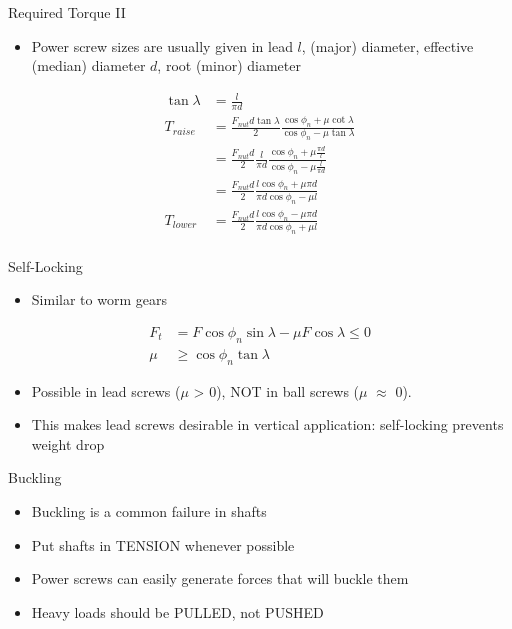 \documentclass[10pt, svgnames]{beamer}
\begin{document}
\begin{frame}[label={sec:orga477ea1}]{Required Torque II}
\begin{itemize}
\item Power screw sizes are usually given in lead \(l\), (major) diameter, effective (median) diameter \(d\), root (minor) diameter
\end{itemize}

\begin{align*}
  \tan \lambda &= \frac{l}{\pi d} \\
  T_{raise} &= \frac{F_{nut}d \tan \lambda}{2} \frac{\cos \phi_{n} + \mu \cot \lambda}{\cos \phi_{n} - \mu \tan \lambda} \\
           &= \frac{F_{nut}d}{2} \frac{l}{\pi d} \frac{\cos \phi_{n} + \mu \frac{\pi d}{l}}{\cos \phi_{n} - \mu \frac{l}{\pi d}} \\
           &= \frac{F_{nut}d}{2} \frac{l \cos \phi_{n} + \mu \pi d}{\pi d \cos \phi_{n} - \mu l} \\
  T_{lower} &= \frac{F_{nut}d}{2} \frac{l \cos \phi_{n} - \mu \pi d}{\pi d \cos \phi_{n} + \mu l} \\
\end{align*}
\end{frame}

\begin{frame}[label={sec:org8ee0539}]{Self-Locking}
\begin{itemize}
\item Similar to worm gears
\end{itemize}

\begin{align*}
  F_{t} &= F \cos \phi_{n} \sin \lambda - \mu F \cos \lambda \leqslant 0 \\
  \mu &\geqslant \cos \phi_{n} \tan \lambda
\end{align*}

\begin{itemize}
\item Possible in lead screws (\(\mu\) > 0), \alert{NOT} in ball screws (\(\mu\) \(\approx\) 0).
\item This makes lead screws desirable in vertical application: self-locking prevents weight drop
\end{itemize}
\end{frame}

\begin{frame}[label={sec:org4f32d08}]{Buckling}
\begin{itemize}
\item Buckling is a common failure in shafts

\item Put shafts in TENSION whenever possible

\item Power screws can easily generate forces that will buckle them

\item Heavy loads should be PULLED, not PUSHED
\end{itemize}
\end{frame}
\end{document}
